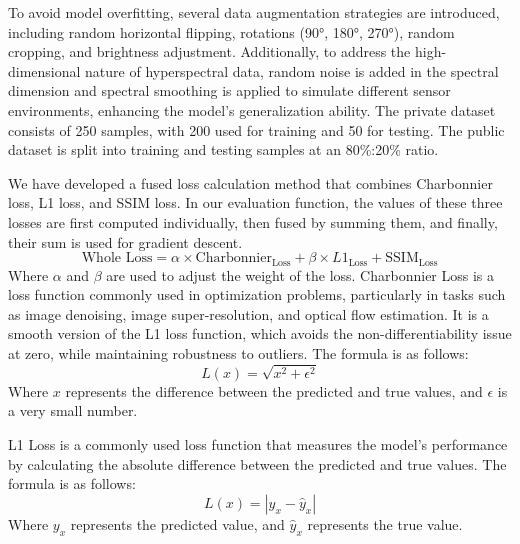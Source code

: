\documentclass[preprint,review,12pt]{elsarticle}
\begin{document}
To avoid model overfitting, several data augmentation strategies are introduced, including random horizontal flipping, rotations (90°, 180°, 270°), random cropping, and brightness adjustment. Additionally, to address the high-dimensional nature of hyperspectral data, random noise is added in the spectral dimension and spectral smoothing is applied to simulate different sensor environments, enhancing the model's generalization ability. The private dataset consists of 250 samples, with 200 used for training and 50 for testing. The public dataset is split into training and testing samples at an 80\%:20\% ratio.

We have developed a fused loss calculation method that combines Charbonnier loss, L1 loss, and SSIM loss. In our evaluation function, the values of these three losses are first computed individually, then fused by summing them, and finally, their sum is used for gradient descent.
\begin{equation}
\text{Whole Loss} = \alpha \times \text{Charbonnier}_{\text{Loss}} + \beta \times L1_{\text{Loss}} + \text{SSIM}_{\text{Loss}}
\end{equation}
Where $\alpha$ and $\beta$ are used to adjust the weight of the loss. Charbonnier Loss is a loss function commonly used in optimization problems, particularly in tasks such as image denoising, image super-resolution, and optical flow estimation. It is a smooth version of the L1 loss function, which avoids the non-differentiability issue at zero, while maintaining robustness to outliers. The formula is as follows:
\begin{equation}
L(x) = \sqrt{x^2 + \epsilon^2}
\end{equation}
Where $x$ represents the difference between the predicted and true values, and $\epsilon$ is a very small number.

L1 Loss is a commonly used loss function that measures the model's performance by calculating the absolute difference between the predicted and true values. The formula is as follows:
\begin{equation}
L(x) = |y_x - \hat{y}_x|
\end{equation}
Where $y_x$ represents the predicted value, and $\hat{y}_x$ represents the true value.
\end{document}
